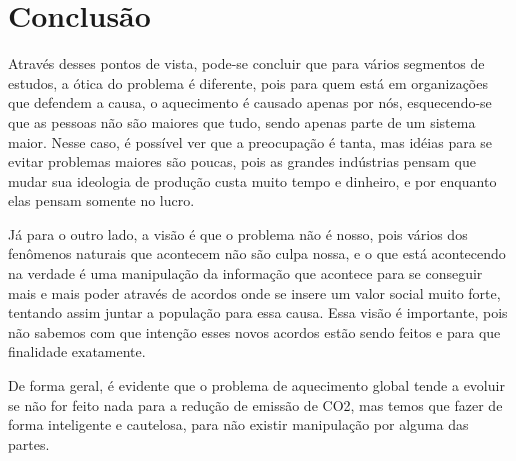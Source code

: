 \section{Conclusão}
Através desses pontos de vista, pode-se concluir que para vários segmentos
de estudos, a ótica do problema é diferente, pois para quem está em
organizações que defendem a causa, o aquecimento é causado apenas por nós,
esquecendo-se que as pessoas não são maiores que tudo, sendo apenas parte de
um sistema maior. Nesse caso, é possível ver que a preocupação é tanta, mas
idéias para se evitar problemas maiores são poucas, pois as grandes
indústrias pensam que mudar sua ideologia de produção custa muito tempo e
dinheiro, e por enquanto elas pensam somente no lucro.

Já para o outro lado, a visão é que o problema não é nosso, pois vários
dos fenômenos naturais que acontecem não são culpa nossa, e o que está
acontecendo na verdade é uma manipulação da informação que acontece para se
conseguir mais e mais poder através de acordos onde se insere um valor
social muito forte, tentando assim juntar a população para essa causa. Essa
visão é importante, pois não sabemos com que intenção esses novos acordos
estão sendo feitos e para que finalidade exatamente.

De forma geral, é evidente que o problema de aquecimento global tende a
evoluir se não for feito nada para a redução de emissão de CO2, mas temos
que fazer de forma inteligente e cautelosa, para não existir manipulação por
alguma das partes.
